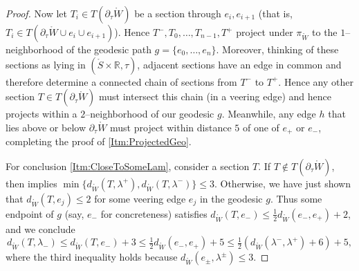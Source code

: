 \documentclass[11pt,letterpaper]{amsart}
\newcommand{\RR}[0]{\mathbb{R}}
\newcommand{\mr}{\mathring}
\newcommand{\bdy}{\partial} %
\newcommand{\psub}{\mr W}
\numberwithin{equation}{section}
\theoremstyle{definition}
\newcommand{\p}{{\bf p}}
\renewcommand{\int}{\mathrm{int}}
\begin{document}
\begin{proof}

Now let $T_i\in T(\bdy_\tau \psub)$ be a section through $e_i, e_{i+1}$ (that is, $T_i \in T(\bdy_\tau \psub \cup e_i \cup e_{i+1})$). 
Hence $T^-, T_0, \ldots, T_{n-1}, T^+$ project under $\pi_{\psub}$ to the $1$--neighborhood of the geodesic path $g = \{e_0, \ldots, e_n\}$. Moreover, thinking of these sections as lying in $(\mr S\times \RR,\tau)$, adjacent sections have an edge in common and therefore determine a connected chain of sections from $T^-$ to $T^+$. Hence any other section $T \in T(\bdy_\tau \psub)$ must intersect this chain (in a veering edge) and hence projects within a $2$--neighborhood of our geodesic $g$. Meanwhile, any edge $h$ that lies above or below $\bdy_\tau \psub$ must project within distance $5$ of one of $e_+$ or $e_-$, completing the proof of  \eqref{Itm:ProjectedGeo}.

 For conclusion \eqref{Itm:CloseToSomeLam}, consider a section $T$. If $T \notin T(\bdy_\tau \psub)$, then  implies  $\min \{ d_{\psub}(T, \lambda^+), d_{\psub}(T, \lambda^-) \} \leq 3$. Otherwise, we have just shown that $d_{\psub}(T, e_j) \leq 2$ for some veering edge $e_j$ in the geodesic $g$. Thus some endpoint of $g$ (say, $e_-$ for concreteness) satisfies $d_{\psub}(T, e_-) \leq \frac{1}{2}d_{\psub}(e_-, e_+) + 2$, and we conclude
 \[
 d_{\psub}(T, \lambda_-) \leq d_{\psub}(T, e_-) + 3 \leq \tfrac{1}{2}d_{\psub}(e_-, e_+) + 5 \leq \tfrac{1}{2} \left( d_{\psub}(\lambda^-, \lambda^+) + 6 \right) + 5,
 \]
 where the third inequality holds because $d_{\psub}(e_\pm, \lambda^\pm) \leq 3$.


\end{proof}
\end{document}
